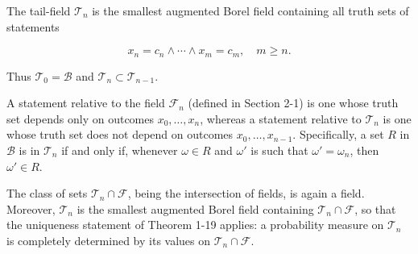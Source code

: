 The tail-field $\mathcal{T}_n$ is the smallest augmented Borel field containing all truth sets of statements

$$x_n = c_n \land \cdots \land x_m = c_m, \quad m \geq n.$$

Thus $\mathcal{T}_0 = \mathcal{B}$ and $\mathcal{T}_n \subset \mathcal{T}_{n-1}$.

A statement relative to the field $\mathcal{F}_n$ (defined in Section 2-1) is one whose truth set depends only on outcomes $x_0, \ldots, x_n$, whereas a statement relative to $\mathcal{T}_n$ is one whose truth set does not depend on outcomes $x_0, \ldots, x_{n-1}$. Specifically, a set $R$ in $\mathcal{B}$ is in $\mathcal{T}_n$ if and only if, whenever $\omega \in R$ and $\omega'$ is such that $\omega' = \omega_n$, then $\omega' \in R$.

The class of sets $\mathcal{T}_n \cap \mathcal{F}$, being the intersection of fields, is again a field. Moreover, $\mathcal{T}_n$ is the smallest augmented Borel field containing $\mathcal{T}_n \cap \mathcal{F}$, so that the uniqueness statement of Theorem 1-19 applies: a probability measure on $\mathcal{T}_n$ is completely determined by its values on $\mathcal{T}_n \cap \mathcal{F}$.
